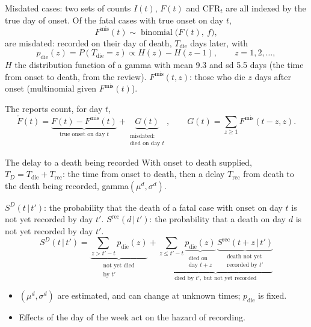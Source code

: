 \documentclass[aspectratio=169,9pt]{beamer}
\newcommand{\given}{\,|\,}
\newcommand{\bin}{\operatorname{binomial}}
\newcommand{\cfr}{\mathrm{CFR}}
\begin{document}
\begin{frame}{Misdated cases: two sets of counts}
$I(t)$, $F(t)$ and $\cfr_t$ are all indexed by the true day of onset. Of the fatal cases with
true onset on day $t$,
\[
F^{\mathrm{mis}}(t)\sim\bin\bigl(F(t),\ f\bigr),
\]
are misdated: recorded on their day of death, $T_{\text{die}}$ days later, with
\[
p_{\text{die}}(z)=P(T_{\text{die}}=z)\propto H(z)-H(z-1),\qquad z=1,2,\dots,
\]
$H$ the distribution function of a gamma with mean 9.3 and sd 5.5 days (the
time from onset to death, from the review). $F^{\mathrm{mis}}(t,z)$: those
who die $z$ days after onset (multinomial given $F^{\mathrm{mis}}(t)$).

\bigskip
The reports count, for day $t$,
\[
\tilde{F}(t)=\underbrace{F(t)-F^{\mathrm{mis}}(t)}_{\text{true onset on day }t}
+\underbrace{G(t)}_{\substack{\text{misdated:}\\\text{died on day }t}},\qquad
G(t)=\sum_{z\ge1}F^{\mathrm{mis}}(t-z,z).
\]

\end{frame}

\begin{frame}{The delay to a death being recorded}
With onset to death supplied, $T_D=T_{\text{die}}+T_{\text{rec}}$: the time
from onset to death, then a delay $T_{\text{rec}}$ from death to the death
being recorded, gamma$(\mu^{d},\sigma^{d})$.

\medskip
$S^{D}(t\given t')$: the probability that the death of a fatal case with
onset on day $t$ is not yet recorded by day $t'$. $S^{\text{rec}}(d\given t')$:
the probability that a death on day $d$ is not yet recorded by day $t'$.
\[
S^{D}(t\given t')=\underbrace{\sum_{z>t'-t}p_{\text{die}}(z)}_{\substack{\text{not yet died}\\\text{by }t'}}
+\underbrace{\sum_{z\le t'-t}\underbrace{p_{\text{die}}(z)}_{\substack{\text{died on}\\\text{day }t+z}}\,
\underbrace{S^{\text{rec}}(t+z\given t')}_{\substack{\text{death not yet}\\\text{recorded by }t'}}}_{\text{died by }t'\text{, but not yet recorded}}
\]

\begin{itemize}
\item $(\mu^{d},\sigma^{d})$ are estimated, and can change at unknown
times; $p_{\text{die}}$ is fixed.
\item Effects of the day of the week act on the hazard of recording.
\end{itemize}
\end{frame}
\end{document}
